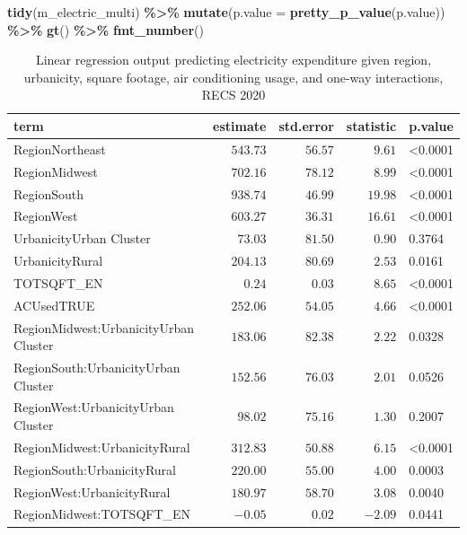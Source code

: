 \documentclass[
]{krantz}
\makeatletter
\newenvironment{Shaded}{\begin{snugshade}}{\end{snugshade}}
\newcommand{\AttributeTok}[1]{\textcolor[rgb]{0.27,0.27,0.27}{#1}}
\newcommand{\FunctionTok}[1]{\textcolor[rgb]{0.27,0.27,0.27}{\textbf{#1}}}
\newcommand{\NormalTok}[1]{#1}
\newcommand{\SpecialCharTok}[1]{\textcolor[rgb]{0.43,0.43,0.43}{\textbf{#1}}}
\newenvironment{kframe}{%
\medskip{}
\setlength{\fboxsep}{.8em}
 \def\at@end@of@kframe{}%
 \ifinner\ifhmode%
  \def\at@end@of@kframe{\end{minipage}}%
  \begin{minipage}{\columnwidth}%
 \fi\fi%
 \def\FrameCommand##1{\hskip\@totalleftmargin \hskip-\fboxsep
 \colorbox{shadecolor}{##1}\hskip-\fboxsep
     \hskip-\linewidth \hskip-\@totalleftmargin \hskip\columnwidth}%
 \MakeFramed {\advance\hsize-\width
   \@totalleftmargin\z@ \linewidth\hsize
   \@setminipage}}%
 {\par\unskip\endMakeFramed%
 \at@end@of@kframe}
\renewenvironment{Shaded}{\begin{kframe}}{\end{kframe}}
\makeatother
\begin{document}
\begin{Shaded}
\begin{Highlighting}[]
\FunctionTok{tidy}\NormalTok{(m\_electric\_multi) }\SpecialCharTok{\%\textgreater{}\%}
  \FunctionTok{mutate}\NormalTok{(}\AttributeTok{p.value =} \FunctionTok{pretty\_p\_value}\NormalTok{(p.value)) }\SpecialCharTok{\%\textgreater{}\%}
  \FunctionTok{gt}\NormalTok{() }\SpecialCharTok{\%\textgreater{}\%}
  \FunctionTok{fmt\_number}\NormalTok{()}
\end{Highlighting}
\end{Shaded}



\begin{longtable}{lrrrl}
\caption{\label{tab:model-lmr-examp-tab}Linear regression output predicting electricity expenditure given region, urbanicity, square footage, air conditioning usage, and one-way interactions, RECS 2020}\\
\toprule
term & estimate & std.error & statistic & p.value \\ 
\midrule
RegionNortheast & $543.73$ & $56.57$ & $9.61$ & <0.0001 \\ 
RegionMidwest & $702.16$ & $78.12$ & $8.99$ & <0.0001 \\ 
RegionSouth & $938.74$ & $46.99$ & $19.98$ & <0.0001 \\ 
RegionWest & $603.27$ & $36.31$ & $16.61$ & <0.0001 \\ 
UrbanicityUrban Cluster & $73.03$ & $81.50$ & $0.90$ & 0.3764 \\ 
UrbanicityRural & $204.13$ & $80.69$ & $2.53$ & 0.0161 \\ 
TOTSQFT\_EN & $0.24$ & $0.03$ & $8.65$ & <0.0001 \\ 
ACUsedTRUE & $252.06$ & $54.05$ & $4.66$ & <0.0001 \\ 
RegionMidwest:UrbanicityUrban Cluster & $183.06$ & $82.38$ & $2.22$ & 0.0328 \\ 
RegionSouth:UrbanicityUrban Cluster & $152.56$ & $76.03$ & $2.01$ & 0.0526 \\ 
RegionWest:UrbanicityUrban Cluster & $98.02$ & $75.16$ & $1.30$ & 0.2007 \\ 
RegionMidwest:UrbanicityRural & $312.83$ & $50.88$ & $6.15$ & <0.0001 \\ 
RegionSouth:UrbanicityRural & $220.00$ & $55.00$ & $4.00$ & 0.0003 \\ 
RegionWest:UrbanicityRural & $180.97$ & $58.70$ & $3.08$ & 0.0040 \\ 
RegionMidwest:TOTSQFT\_EN & $-0.05$ & $0.02$ & $-2.09$ & 0.0441 \\ 

\end{longtable}
\end{document}
